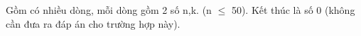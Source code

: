 Gồm có nhiều dòng, mỗi dòng gồm 2 số n,k. (n $\le$ 50). Kết thúc là số 0 (không cần đưa ra đáp án cho trường hợp này).